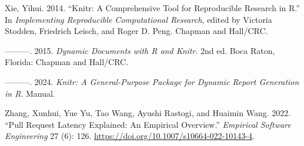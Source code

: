 \documentclass[
]{article}
\newlength{\cslhangindent}
\newenvironment{CSLReferences}[2] %
 {\begin{list}{}{%
  \setlength{\itemindent}{0pt}
  \setlength{\leftmargin}{0pt}
  \setlength{\parsep}{0pt}
  \ifodd #1
   \setlength{\leftmargin}{\cslhangindent}
   \setlength{\itemindent}{-1\cslhangindent}
  \fi
  \setlength{\itemsep}{#2\baselineskip}}}
 {\end{list}}
\begin{document}
\begin{CSLReferences}{1}{0}
Xie, Yihui. 2014. {``Knitr: A Comprehensive Tool for Reproducible
Research in {R}.''} In \emph{Implementing Reproducible Computational
Research}, edited by Victoria Stodden, Friedrich Leisch, and Roger D.
Peng. {Chapman and Hall/CRC}.

---------. 2015. \emph{Dynamic Documents with {R} and Knitr}. 2nd ed.
Boca Raton, Florida: {Chapman and Hall/CRC}.

---------. 2024. \emph{Knitr: A General-Purpose Package for Dynamic
Report Generation in {R}}. Manual.

Zhang, Xunhui, Yue Yu, Tao Wang, Ayushi Rastogi, and Huaimin Wang. 2022.
{``Pull Request Latency Explained: An Empirical Overview.''}
\emph{Empirical Software Engineering} 27 (6): 126.
\url{https://doi.org/10.1007/s10664-022-10143-4}.

\end{CSLReferences}
\end{document}
